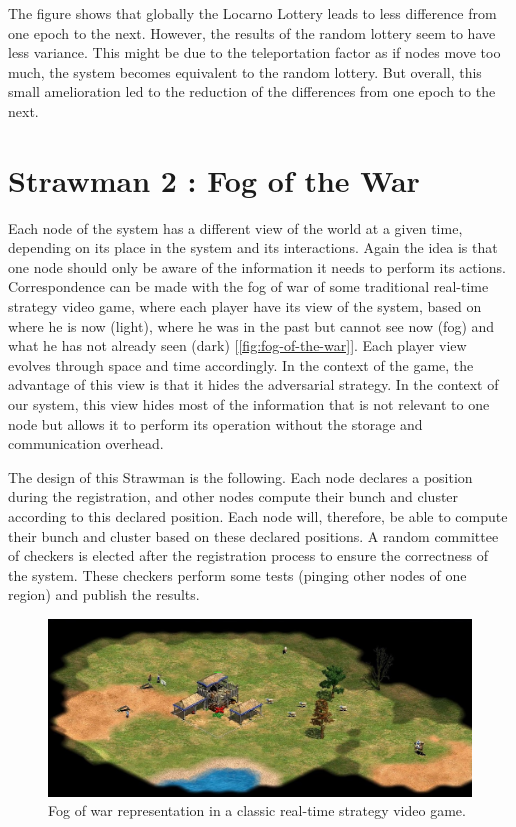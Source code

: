 \documentclass[a4paper,11pt,twoside=semi,openright]{report}
\begin{document}
The figure shows that globally the Locarno Lottery leads to less difference
from one epoch to the next. However, the results of the random lottery seem to
have less variance. This might be due to the teleportation factor as if nodes
move too much, the system becomes equivalent to the random lottery. But
overall, this small amelioration led to the reduction of the differences from
one epoch to the next.

\section{Strawman 2 : Fog of the War} \label{sec:Fog-of-the-war}

Each node of the system has a different view of the world at a given time, depending on its place in the system and its interactions. Again the idea is
that one node should only be aware of the information it needs to perform its
actions. Correspondence can be made with the fog of war of some traditional
real-time strategy video game, where each player have its view of the
system, based on where he is now (light), where he was in the past but cannot
see now (fog) and what he has not already seen (dark)
[\autoref{fig:fog-of-the-war}]. Each player view evolves through space and
time accordingly. In the context of the game, the advantage of this view is
that it hides the adversarial strategy. In the context of our system, this view
hides most of the information that is not relevant to one node but allows it
to perform its operation without the storage and communication overhead. 

The design of this Strawman is the following. Each node declares a
position during the registration, and other nodes compute their bunch and
cluster according to this declared position. Each node will, therefore, be able
to compute their bunch and cluster based on these declared positions. A random committee of checkers is elected after
the registration process to ensure
the correctness of the system. These checkers perform some tests (pinging other
nodes of one region) and publish the results. 

\begin{figure}[!h] 
\centering
\includegraphics[width=400pt]{figures/fog_of_war}
\caption{Fog of war representation in a classic real-time strategy video game. \cite{ageofempire1999} }
\label{fig:fog-of-the-war}
\end{figure}
\end{document}
